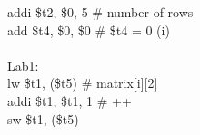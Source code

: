 \documentclass[../main.tex]{subfiles}
\begin{document}
{    \hspace*{4mm} \hspace*{0cm} \hspace*{0cm} \hspace*{0cm} \hspace*{0cm} addi \$t2, \$0, 5 \hspace*{0cm} \hspace*{0cm} \hspace*{0cm} \hspace*{0cm} \# number of rows \\
    \hspace*{4mm} \hspace*{0cm} \hspace*{0cm} \hspace*{0cm} \hspace*{0cm} add \$t4, \$0, \$0 \hspace*{0cm} \hspace*{0cm} \hspace*{0cm} \hspace*{0cm} \# \$t4 = 0 (i) \\
    \\
    \hspace*{4mm} Lab1: \\
    \hspace*{4mm} \hspace*{0cm} \hspace*{0cm} \hspace*{0cm} \hspace*{0cm} lw \$t1, (\$t5) \hspace*{0cm} \hspace*{0cm} \hspace*{0cm} \hspace*{0cm} \hspace*{0cm} \hspace*{0cm} \# matrix[i][2] \\
    \hspace*{4mm} \hspace*{0cm} \hspace*{0cm} \hspace*{0cm} \hspace*{0cm} addi \$t1, \$t1, 1 \hspace*{0cm} \hspace*{0cm} \hspace*{0cm} \# ++ \\
    \hspace*{4mm} \hspace*{0cm} \hspace*{0cm} \hspace*{0cm} \hspace*{0cm} sw \$t1, (\$t5) \\
}
\end{document}
